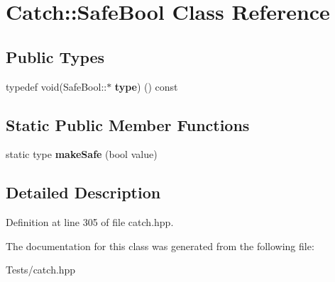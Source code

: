 \hypertarget{class_catch_1_1_safe_bool}{}\section{Catch\+:\+:Safe\+Bool Class Reference}
\label{class_catch_1_1_safe_bool}
\subsection*{Public Types}
\begin{DoxyCompactItemize}
\item 
\mbox{\label{class_catch_1_1_safe_bool_a39eef9baed296299d625a54d54a2a958}} 
typedef void(Safe\+Bool\+::$\ast$ {\bfseries type}) () const
\end{DoxyCompactItemize}
\subsection*{Static Public Member Functions}
\begin{DoxyCompactItemize}
\item 
\mbox{\label{class_catch_1_1_safe_bool_af0ea63d9820f8bf7a8b76377913c4e77}} 
static type {\bfseries make\+Safe} (bool value)
\end{DoxyCompactItemize}


\subsection{Detailed Description}


Definition at line 305 of file catch.\+hpp.



The documentation for this class was generated from the following file\+:\begin{DoxyCompactItemize}
\item 
Tests/catch.\+hpp\end{DoxyCompactItemize}
